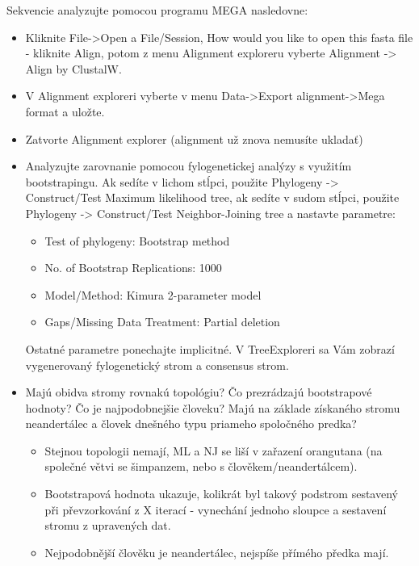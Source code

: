 \documentclass[11pt]{article}
\begin{document}
Sekvencie analyzujte pomocou programu MEGA nasledovne:
\begin{itemize}
\item Kliknite File->Open a File/Session, How would you like to open this
fasta file - kliknite Align, potom z menu Alignment exploreru
vyberte Alignment -> Align by ClustalW.
\item V Alignment exploreri vyberte v menu Data->Export alignment->Mega
format a uložte.
\item Zatvorte Alignment explorer (alignment už znova nemusíte ukladať)
\item Analyzujte zarovnanie pomocou fylogenetickej analýzy s využitím
bootstrapingu. Ak sedíte v lichom stĺpci, použite Phylogeny ->
Construct/Test Maximum likelihood tree, ak sedíte v sudom stĺpci,
použite Phylogeny -> Construct/Test Neighbor-Joining tree a
nastavte parametre:

\begin{itemize}
\item Test of phylogeny: Bootstrap method
\item No. of Bootstrap Replications: 1000
\item Model/Method: Kimura 2-parameter model
\item Gaps/Missing Data Treatment: Partial deletion
\end{itemize}

Ostatné parametre ponechajte implicitné. V TreeExploreri sa Vám
zobrazí vygenerovaný fylogenetický strom a consensus strom.

\item Majú obidva stromy rovnakú topológiu? Čo prezrádzajú bootstrapové hodnoty? Čo
je najpodobnejšie človeku? Majú na základe získaného stromu neandertálec a
človek dnešného typu priameho spoločného predka?
\begin{itemize}
\item Stejnou topologii nemají, ML a NJ se liší v zařazení orangutana (na společné
větvi se šimpanzem, nebo s člověkem/neandertálcem).
\item Bootstrapová hodnota ukazuje, kolikrát byl takový podstrom sestavený při
převzorkování z X iterací - vynechání jednoho sloupce a sestavení stromu z
upravených dat.
\item Nejpodobnější člověku je neandertálec, nejspíše přímého předka mají.
\end{itemize}
\end{itemize}
\end{document}
